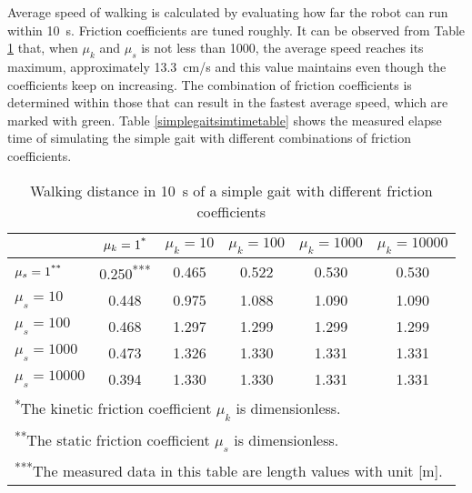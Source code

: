 Average speed of walking is calculated by evaluating how far the robot can run within \SI{10}{\second}. Friction coefficients are tuned roughly. It can be observed from Table {\ref{simplegaitspeedtable}} that, when $ \mu_k $ and $ \mu_s $ is not less than 1000, the average speed reaches its maximum, approximately \SI{13.3}{cm/s} and this value maintains even though the coefficients keep on increasing. The combination of friction coefficients is determined within those that can result in the fastest average speed, which are marked with green. Table {\ref{simplegaitsimtimetable}} shows the measured elapse time of simulating the simple gait with different combinations of friction coefficients. 
\begin{table}[H]
	\centering
	\caption{Walking distance in \SI{10}{\second} of a simple gait with different friction coefficients}
	\label{simplegaitspeedtable}
	\begin{tabular}{lccccc}
		\hline
		&$\mu_k = 1\textsuperscript{*}$&$\mu_k = 10$&$\mu_k = 100$&$\mu_k = 1000$&$ \mu_k = 10000 $\\
		\hline
		$ \mu_s = 1\textsuperscript{**} $&\cellcolor{myred}0.250\textsuperscript{***}&\cellcolor{myred}0.465&\cellcolor{myred}0.522&\cellcolor{myred}0.530&\cellcolor{myred}0.530\\
		\hline
		$ \mu_s = 10 $&\cellcolor{myred}0.448&\cellcolor{myred}0.975&\cellcolor{myyellow}1.088&\cellcolor{myyellow}1.090&\cellcolor{myyellow}1.090\\
		\hline
		$ \mu_s = 100 $&\cellcolor{myred}0.468&\cellcolor{myyellow}1.297&\cellcolor{myyellow}1.299&\cellcolor{myyellow}1.299&\cellcolor{myyellow}1.299\\
		\hline
		$ \mu_s = 1000 $&\cellcolor{myred}0.473&\cellcolor{myyellow}1.326&\cellcolor{myyellow}1.330&\cellcolor{mygreen}1.331 &\cellcolor{mygreen}1.331\\
		\hline
		$ \mu_s = 10000 $&\cellcolor{myred}0.394&\cellcolor{myyellow}1.330&\cellcolor{myyellow}1.330&\cellcolor{mygreen}1.331&\cellcolor{mygreen}1.331\\
		\hline
		\multicolumn{6}{l}{\textsuperscript{*}\footnotesize{The kinetic friction coefficient $ \mu_k $ is dimensionless.}}\\
		\multicolumn{6}{l}{\textsuperscript{**}\footnotesize{The static friction coefficient $ \mu_s $ is dimensionless.}}\\
		\multicolumn{6}{l}{\textsuperscript{***}\footnotesize{The measured data in this table are length values with unit [\si{\meter}].}}
	\end{tabular}
\end{table}

